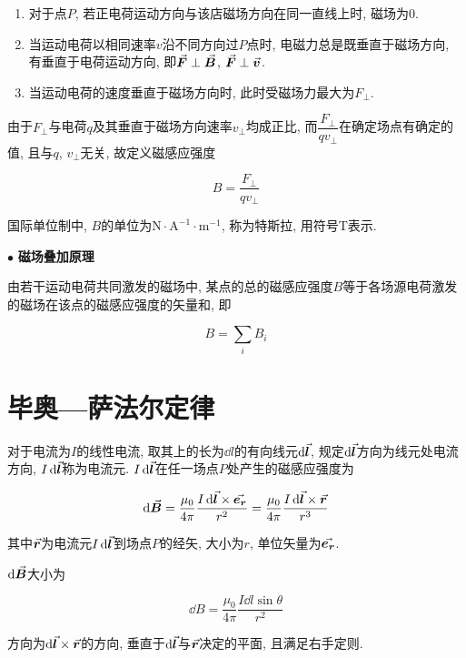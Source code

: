 \begin{enumerate}[itemindent=1em]
	
	\item 对于点$P$, 若正电荷运动方向与该店磁场方向在同一直线上时, 磁场为0. 
	
	\item 当运动电荷以相同速率$v$沿不同方向过$P$点时, 电磁力总是既垂直于磁场方向, 有垂直于电荷运动方向, 即$\va*{F} \perp \va*{B}$, $\va*{F} \perp \va*{v}$. 
	
	\item 当运动电荷的速度垂直于磁场方向时, 此时受磁场力最大为$F_{\bot}$. 
	
\end{enumerate}

由于$F_{\bot}$与电荷$q$及其垂直于磁场方向速率$v_{\bot}$均成正比, 而$\dfrac{F_{\bot}}{qv_{\bot}}$在确定场点有确定的值, 且与$q$, $v_{\bot}$无关, 故定义磁感应强度

\begin{equation}
	B = \dfrac{F_{\bot}}{q v_{\bot}} \label{C8-eq1}
\end{equation}

国际单位制中, $B$的单位为$\textrm{N} \cdot \textrm{A}^{-1} \cdot \textrm{m}^{-1}$, 称为特斯拉, 用符号T表示. 

$\bullet$ \textbf{磁场叠加原理}

由若干运动电荷共同激发的磁场中, 某点的总的磁感应强度$B$等于各场源电荷激发的磁场在该点的磁感应强度的矢量和, 即

\begin{equation}
	B = \sum\limits_{i} B_i \label{C8-eq2}
\end{equation}

\section{毕奥—萨法尔定律}\label{8.2}

\begin{axiom}[毕奥—萨法尔定律]
	对于电流为$I$的线性电流, 取其上的长为$\dd{l}$的有向线元$\dd{\va*{l}}$, 规定$\dd{\va*{l}}$方向为线元处电流方向, $I\dd{\va*{l}}$称为电流元. $I\dd{\va*{l}}$在任一场点$P$处产生的磁感应强度为
	
	\begin{equation}
		\dd{\va*{B}} = \dfrac{\mu_0}{4 \pi} \dfrac{I \dd{\va*{l}} \times \va*{e_r}}{r^2} = \dfrac{\mu_0}{4 \pi} \dfrac{I \dd{\va*{l}} \times \va*{r}}{r^3} \label{C8-eq3}
	\end{equation}
	
	其中$\va*{r}$为电流元$I\dd{\va*{l}}$到场点$P$的经矢, 大小为$r$, 单位矢量为$\va*{e_r}$. 
	
	$\dd{\va*{B}}$大小为
	
	\begin{equation}
		\dd{B} = \dfrac{\mu_0}{4 \pi} \dfrac{I \dd{l} \sin \theta}{r^2} \label{C8-eq4}
	\end{equation}
	
	方向为$\dd{\va*{l} \times \va*{r}}$的方向, 垂直于$\dd{\va*{l}}$与$\va*{r}$决定的平面, 且满足右手定则. 
	
\end{axiom}

